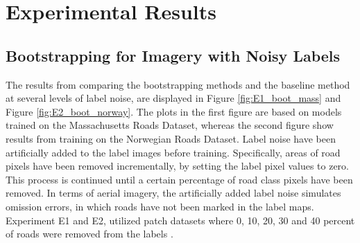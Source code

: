 \section{Experimental Results}
\label{sec:experimentalResults}
\subsection{Bootstrapping for Imagery with Noisy Labels}
\label{sec:results_bootstrapping}

The results from comparing the bootstrapping methods and the baseline method at several levels of label noise, are displayed in Figure \ref{fig:E1_boot_mass} and Figure \ref{fig:E2_boot_norway}. The plots in the first figure are based on models trained on the Massachusetts Roads Dataset, whereas the second figure show results from training on the Norwegian Roads Dataset. Label noise have been artificially added to the label images before training. Specifically, areas of road pixels have been removed incrementally, by setting the label pixel values to zero. This process is continued until a certain percentage of road class pixels have been removed. In terms of aerial imagery, the artificially added label noise simulates omission errors, in which roads have not been marked in the label maps. Experiment E1 and E2, utilized patch datasets where 0, 10, 20, 30 and 40 percent of roads were removed from the labels .\\


